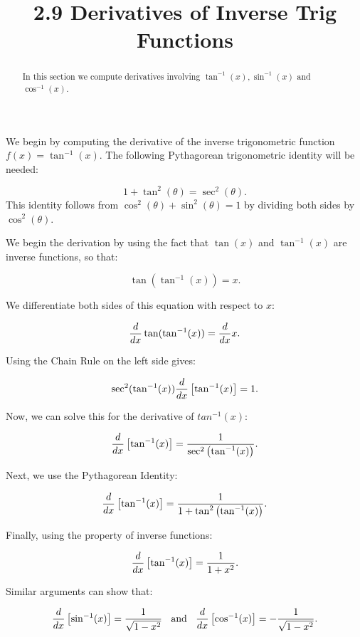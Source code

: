 \documentclass[handout]{ximera}
\title{2.9 Derivatives of Inverse Trig Functions}
\begin{document}
\begin{abstract}
In this section we compute derivatives involving $\tan^{-1}(x), \sin^{-1}(x)$ and $\cos^{-1}(x)$.
\end{abstract}

\maketitle


We begin by computing the derivative of the inverse trigonometric function $f(x) = \tan^{-1}(x)$.  
The following Pythagorean trigonometric identity will be needed:


\[
1 + \tan^2(\theta) = \sec^2(\theta).
\]
This identity follows from $\cos^2(\theta) + \sin^2(\theta) = 1$ by dividing both sides by $\cos^2(\theta)$.

We begin the derivation by using the fact that $\tan(x)$ and $\tan^{-1}(x)$ are inverse functions, so that:

\[
\tan(\tan^{-1}(x)) = x.
\]

We differentiate both sides of this equation with respect to $x$:

\[
\frac{\mathop{}\!d }{\mathop{}\!d x} \tan(\tan^{-1}(x)) = \frac{d}{\mathop{}\!d x} x.
\]

Using the Chain Rule on the left side gives:

\[
\sec^2(\tan^{-1}(x)) \frac{d}{\mathop{}\!d x} \left[\tan^{-1}(x)\right] = 1.
\]

Now, we can solve this for the derivative of $tan^{-1}(x)$:

\[
 \frac{d}{\mathop{}\!d x} \left[\tan^{-1}(x)\right] = \frac{1}{\sec^2\left(\tan^{-1}(x)\right)}.
\]

Next, we use the Pythagorean Identity:

\[
 \frac{d}{\mathop{}\!d x} \left[\tan^{-1}(x)\right] = \frac{1}{1 + \tan^2\left(\tan^{-1}(x)\right)}.
\]

Finally, using the property of inverse functions:

\[
 \frac{d}{\mathop{}\!d x} \left[\tan^{-1}(x)\right] = \frac{1}{1 + x^2}.
\]


Similar arguments can show that:

\[
 \frac{d}{\mathop{}\!d x} \left[\sin^{-1}(x)\right] = \frac{1}{\sqrt{1 - x^2}} \;\;\text{  and  } \;\;\frac{d}{\mathop{}\!d x} \left[\cos^{-1}(x)\right] = -\frac{1}{\sqrt{1 - x^2}}.
\]



\begin{foldable}
\end{foldable}
\end{document}
